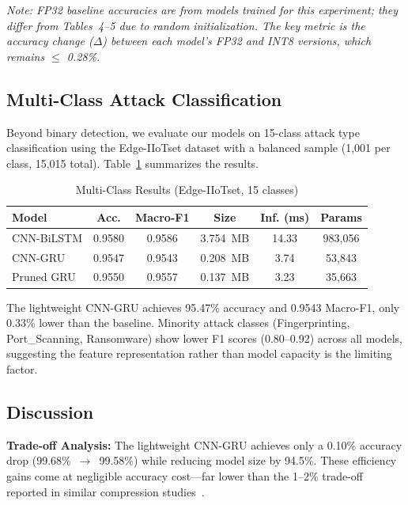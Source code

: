 \documentclass[a4paper,fleqn]{cas-sc}
\begin{document}
\noindent\textit{Note: FP32 baseline accuracies are from models trained for this experiment; they differ from Tables~4--5 due to random initialization. The key metric is the accuracy change ($\Delta$) between each model's FP32 and INT8 versions, which remains $\le$ 0.28\%.}

\subsection{Multi-Class Attack Classification}
\label{sec:multiclass}

Beyond binary detection, we evaluate our models on 15-class attack type classification using the Edge-IIoTset dataset with a balanced sample (1,001 per class, 15,015 total). Table~\ref{tab:multiclass} summarizes the results.

\begin{table}[t]
\centering
\caption{Multi-Class Results (Edge-IIoTset, 15 classes)}
\label{tab:multiclass}
\begin{tabular}{lccccc}
\toprule
Model & Acc. & Macro-F1 & Size & Inf. (ms) & Params \\
\midrule
CNN-BiLSTM & 0.9580 & 0.9586 & 3.754~MB & 14.33 & 983,056 \\
CNN-GRU & 0.9547 & 0.9543 & 0.208~MB & 3.74 & 53,843 \\
Pruned GRU & 0.9550 & 0.9557 & 0.137~MB & 3.23 & 35,663 \\
\bottomrule
\end{tabular}
\end{table}

The lightweight CNN-GRU achieves 95.47\% accuracy and 0.9543 Macro-F1, only 0.33\% lower than the baseline. Minority attack classes (Fingerprinting, Port\_Scanning, Ransomware) show lower F1 scores (0.80--0.92) across all models, suggesting the feature representation rather than model capacity is the limiting factor.

\subsection{Discussion}
\label{sec:discussion}

\textbf{Trade-off Analysis:} The lightweight CNN-GRU achieves only a 0.10\% accuracy drop (99.68\%~$\rightarrow$~99.58\%) while reducing model size by 94.5\%. These efficiency gains come at negligible accuracy cost---far lower than the 1--2\% trade-off reported in similar compression studies~\cite{anwer2025advanced,pecherle2026federated}.
\end{document}

